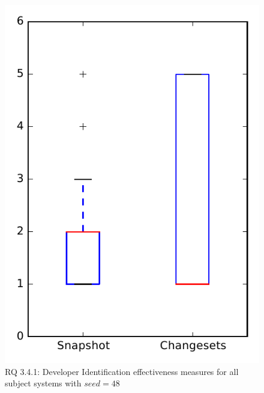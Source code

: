 
\begin{figure}
\centering
\includegraphics[height=0.4\textheight]{figures/dit_seed/rq1_overview_48}
\caption{RQ 3.4.1: Developer Identification effectiveness measures for all subject systems with $seed=48$}
\label{fig:dit_seed:rq1:overview}
\end{figure}
